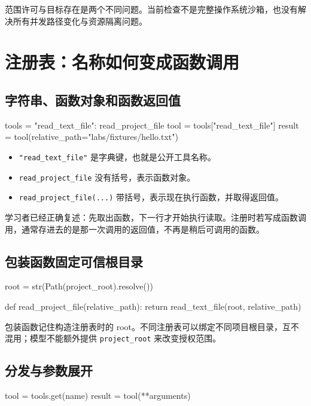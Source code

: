 \documentclass[UTF8,zihao=-4,fontset=fandol]{ctexart}
\begin{document}
范围许可与目标存在是两个不同问题。当前检查不是完整操作系统沙箱，也没有解决所有并发路径变化与资源隔离问题。

\section{注册表：名称如何变成函数调用}

\subsection{字符串、函数对象和函数返回值}

\begin{Code}
tools = {"read_text_file": read_project_file}
tool = tools["read_text_file"]
result = tool(relative_path="labs/fixtures/hello.txt")
\end{Code}

\begin{itemize}
\item \nolinkurl{"read_text_file"} 是字典键，也就是公开工具名称。
\item \nolinkurl{read_project_file} 没有括号，表示函数对象。
\item \nolinkurl{read_project_file(...)} 带括号，表示现在执行函数，并取得返回值。
\end{itemize}

学习者已经正确复述：先取出函数，下一行才开始执行读取。注册时若写成函数调用，通常存进去的是那一次调用的返回值，不再是稍后可调用的函数。

\subsection{包装函数固定可信根目录}

\begin{Code}
root = str(Path(project_root).resolve())

def read_project_file(relative_path):
    return read_text_file(root, relative_path)
\end{Code}

包装函数记住构造注册表时的 root。不同注册表可以绑定不同项目根目录，互不混用；模型不能额外提供 \nolinkurl{project_root} 来改变授权范围。

\subsection{分发与参数展开}

\begin{Code}
tool = tools.get(name)
result = tool(**arguments)
\end{Code}
\end{document}
